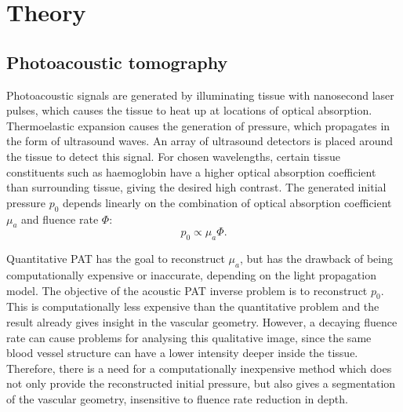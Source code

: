 \documentclass[journal]{IEEEtran}
\begin{document}
\section{Theory}\label{sec:theory}

\subsection{Photoacoustic tomography}
Photoacoustic signals are generated by illuminating tissue with nanosecond laser pulses, which causes the tissue to heat up at locations of optical absorption. Thermoelastic expansion causes the generation of pressure, which propagates in the form of ultrasound waves. An array of ultrasound detectors is placed around the tissue to detect this signal. For chosen wavelengths, certain tissue constituents such as haemoglobin have a higher optical absorption coefficient than surrounding tissue, giving the desired high contrast. The generated initial pressure $p_0$ depends linearly on the combination of optical absorption coefficient $\mu_a$ and fluence rate $\Phi$:
\begin{equation}
p_0\propto \mu_a\Phi.
\end{equation}

Quantitative PAT \cite{Cox2012} has the goal to reconstruct $\mu_a$, but has the drawback of being computationally expensive or inaccurate, depending on the light propagation model. The objective of the acoustic PAT inverse problem is to reconstruct $p_0$. This is computationally less expensive than the quantitative problem and the result already gives insight in the vascular geometry. However, a decaying fluence rate can cause problems for analysing this qualitative image, since the same blood vessel structure can have a lower intensity deeper inside the tissue. Therefore, there is a need for a computationally inexpensive method which does not only provide the reconstructed initial pressure, but also gives a segmentation of the vascular geometry, insensitive to fluence rate reduction in depth. 
\end{document}

